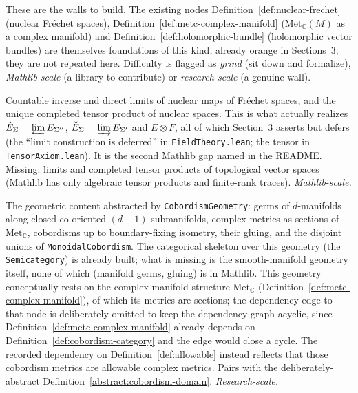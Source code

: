 These are the walls to build. The existing nodes
Definition~\ref{def:nuclear-frechet} (nuclear Fr\'echet spaces),
Definition~\ref{def:metc-complex-manifold} ($\mathrm{Met}_{\mathbb C}(M)$ as a complex
manifold) and Definition~\ref{def:holomorphic-bundle} (holomorphic vector bundles) are
themselves foundations of this kind, already orange in Sections~3; they are not repeated
here. Difficulty is flagged as \emph{grind} (sit down and formalize),
\emph{Mathlib-scale} (a library to contribute) or \emph{research-scale} (a genuine wall).

\begin{definition}
  \label{found:tvs-limits-tensor}
  \notready
  Countable inverse and direct limits of nuclear maps of Fr\'echet spaces, and the unique
  completed tensor product of nuclear spaces. This is what actually realizes
  $\hat E_\Sigma = \varprojlim E_{\Sigma''}$, $\check E_\Sigma = \varinjlim E_{\Sigma'}$ and
  $E \otimes F$, all of which Section~3 asserts but defers (the ``limit construction is
  deferred'' in \texttt{FieldTheory.lean}; the tensor in \texttt{TensorAxiom.lean}). It is
  the second Mathlib gap named in the README. Missing: limits and completed tensor products
  of topological vector spaces (Mathlib has only algebraic tensor products and finite-rank
  traces). \emph{Mathlib-scale.}
\end{definition}

\begin{definition}
  \label{found:smooth-cobordism-geometry}
  \notready
  The geometric content abstracted by \texttt{CobordismGeometry}: germs of $d$-manifolds
  along closed co-oriented $(d-1)$-submanifolds, complex metrics as sections of
  $\mathrm{Met}_{\mathbb C}$, cobordisms up to boundary-fixing isometry, their gluing, and
  the disjoint unions of \texttt{MonoidalCobordism}. The categorical skeleton over this
  geometry (the \texttt{Semicategory}) is already built; what is missing is the
  smooth-manifold geometry itself, none of which (manifold germs, gluing) is in Mathlib.
  This geometry conceptually rests on the complex-manifold structure
  $\mathrm{Met}_{\mathbb C}$ (Definition~\ref{def:metc-complex-manifold}), of which its
  metrics are sections; the dependency edge to that node is deliberately omitted to keep
  the dependency graph acyclic, since Definition~\ref{def:metc-complex-manifold} already
  depends on Definition~\ref{def:cobordism-category} and the edge would close a cycle. The
  recorded dependency on Definition~\ref{def:allowable} instead reflects that those
  cobordism metrics are allowable complex metrics.
  Pairs with the deliberately-abstract Definition~\ref{abstract:cobordism-domain}.
  \emph{Research-scale.}
\end{definition}

